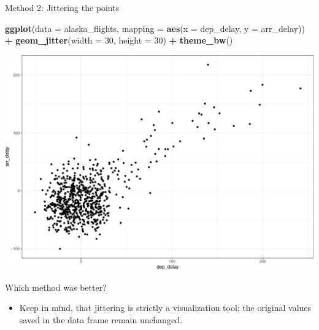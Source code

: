 \documentclass[
  ignorenonframetext,
]{beamer}
\newenvironment{Shaded}{\begin{snugshade}}{\end{snugshade}}
\newcommand{\AttributeTok}[1]{\textcolor[rgb]{0.13,0.29,0.53}{#1}}
\newcommand{\DecValTok}[1]{\textcolor[rgb]{0.00,0.00,0.81}{#1}}
\newcommand{\FunctionTok}[1]{\textcolor[rgb]{0.13,0.29,0.53}{\textbf{#1}}}
\newcommand{\NormalTok}[1]{#1}
\newcommand{\SpecialCharTok}[1]{\textcolor[rgb]{0.81,0.36,0.00}{\textbf{#1}}}
\providecommand{\tightlist}{%
  \setlength{\itemsep}{0pt}\setlength{\parskip}{0pt}}
\begin{document}
\begin{frame}[fragile]{Method 2: Jittering the points}
\protect\hypertarget{method-2-jittering-the-points-2}{}
\tiny

\begin{Shaded}
\begin{Highlighting}[]
\FunctionTok{ggplot}\NormalTok{(}\AttributeTok{data =}\NormalTok{ alaska\_flights, }\AttributeTok{mapping =} \FunctionTok{aes}\NormalTok{(}\AttributeTok{x =}\NormalTok{ dep\_delay, }\AttributeTok{y =}\NormalTok{ arr\_delay)) }\SpecialCharTok{+} 
  \FunctionTok{geom\_jitter}\NormalTok{(}\AttributeTok{width =} \DecValTok{30}\NormalTok{, }\AttributeTok{height =} \DecValTok{30}\NormalTok{) }\SpecialCharTok{+} 
  \FunctionTok{theme\_bw}\NormalTok{()}
\end{Highlighting}
\end{Shaded}

\begin{center}\includegraphics[width=0.7\linewidth,height=0.5\textheight]{Week2_Lect_files/figure-beamer/unnamed-chunk-23-1} \end{center}
\normalsize

Which method was better?

\begin{itemize}
\tightlist
\item
  Keep in mind, that jittering is strictly a visualization tool; the
  original values saved in the data frame remain unchanged.
\end{itemize}
\end{frame}
\end{document}
